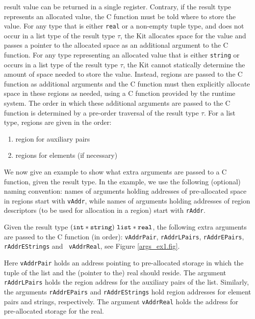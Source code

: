 \documentclass[12pt]{book}
\begin{document}
result value can be returned in a single register. Contrary, if the result type represents an allocated
value, the C function must be told where to store the value. For
any type that is either {\tt real} or a non-empty tuple type, and
does not occur in a list type of the result type $\tau$, the Kit
allocates space for the value and passes a pointer to the allocated
space as an additional argument to the C function. For any type
representing an allocated value that is either {\tt string} or occurs in a
list type of the result type $\tau$, the Kit cannot statically
determine the amount of space needed to store the value. Instead,
regions are passed to the C function as additional arguments and the C
function must then explicitly allocate space in these regions as
needed, using a C function provided by the runtime system. The order
in which these additional arguments are passed to the C function is determined
by a pre-order traversal of the result type $\tau$.  For a list type,
regions are given in the order:
\begin{enumerate}
    \item region for auxiliary pairs
    \item regions for elements (if necessary)
\end{enumerate}

We now give an example to show what extra arguments are passed to a
C function, given the result type. In the example, we use the following
(optional) naming convention: 
names of arguments holding addresses of 
pre-allocated space in regions 
start with {\tt vAddr}, while names of arguments
holding addresses of region descriptors (to be used for allocation in a
region) start with {\tt rAddr}.
\begin{example}
  Given the result type $({\tt int} \ast {\tt string}) ~{\tt list}
  \ast {\tt real}$, the following extra ar\-gu\-ments are passed to the
  C function (in order): {\tt vAddrPair},
  {\tt rAddrLPairs}, {\tt rAddrEPairs}, {\tt rAddrEStrings} and {\tt
    vAddrReal}, see Figure \ref{args_ex1.fig}. 
  
  Here {\tt vAddrPair} holds an address pointing to pre-allocated
  storage in which the tuple of the list and the (pointer to the) real
  should reside. The argument {\tt rAddrLPairs} holds the region
  address for the auxiliary pairs of the list. Similarly, the
  arguments {\tt rAddrEPairs} and {\tt rAddrEStrings} hold region
  addresses for element pairs and strings, respectively. The argument
  {\tt vAddrReal} holds the address for pre-allocated storage for the
  real.
\end{example}
\end{document}
